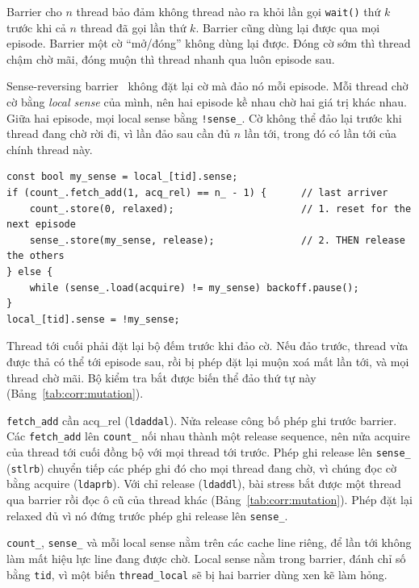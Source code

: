 Barrier cho $n$ thread bảo đảm không thread nào ra khỏi lần gọi \texttt{wait()} thứ $k$ trước khi cả $n$
thread đã gọi lần thứ $k$. Barrier cũng dùng lại được qua mọi episode. Barrier một cờ ``mở/đóng'' không dùng lại
được. Đóng cờ sớm thì thread chậm chờ mãi, đóng muộn thì thread nhanh qua luôn episode sau.

Sense-reversing barrier~\cite{hensgen1988barrier} không đặt lại cờ mà đảo nó mỗi episode. Mỗi thread chờ
cờ bằng \emph{local sense} của mình, nên hai episode kề nhau chờ hai giá trị khác nhau. Giữa hai episode,
mọi local sense bằng \texttt{!sense\_}. Cờ không thể đảo lại trước khi thread đang chờ rời đi, vì lần
đảo sau cần đủ $n$ lần tới, trong đó có lần tới của chính thread này.
\begin{lstlisting}
const bool my_sense = local_[tid].sense;
if (count_.fetch_add(1, acq_rel) == n_ - 1) {      // last arriver
    count_.store(0, relaxed);                      // 1. reset for the next episode
    sense_.store(my_sense, release);               // 2. THEN release the others
} else {
    while (sense_.load(acquire) != my_sense) backoff.pause();
}
local_[tid].sense = !my_sense;
\end{lstlisting}
Thread tới cuối phải đặt lại bộ đếm trước khi đảo cờ. Nếu đảo trước, thread vừa được thả có thể tới
episode sau, rồi bị phép đặt lại muộn xoá mất lần tới, và mọi thread chờ mãi. Bộ kiểm tra bắt được biến thể đảo thứ
tự này (Bảng~\ref{tab:corr:mutation}).

\texttt{fetch\_add} cần acq\_rel (\texttt{ldaddal}). Nửa release công bố phép ghi trước barrier. Các
\texttt{fetch\_add} lên \texttt{count\_} nối nhau thành một release sequence, nên nửa acquire của thread
tới cuối đồng bộ với mọi thread tới trước. Phép ghi release lên \texttt{sense\_} (\texttt{stlrb}) chuyển
tiếp các phép ghi đó cho mọi thread đang chờ, vì chúng đọc cờ bằng acquire (\texttt{ldaprb}). Với chỉ
release (\texttt{ldaddl}), bài stress bắt được một thread qua barrier rồi đọc ô cũ của thread khác
(Bảng~\ref{tab:corr:mutation}). Phép đặt lại relaxed đủ vì nó đứng trước phép ghi release lên
\texttt{sense\_}.

\texttt{count\_}, \texttt{sense\_} và mỗi local sense nằm trên các cache line riêng, để lần tới không làm
mất hiệu lực line đang được chờ. Local sense nằm trong barrier, đánh chỉ số bằng \texttt{tid}, vì một biến
\texttt{thread\_local} sẽ bị hai barrier dùng xen kẽ làm hỏng.

